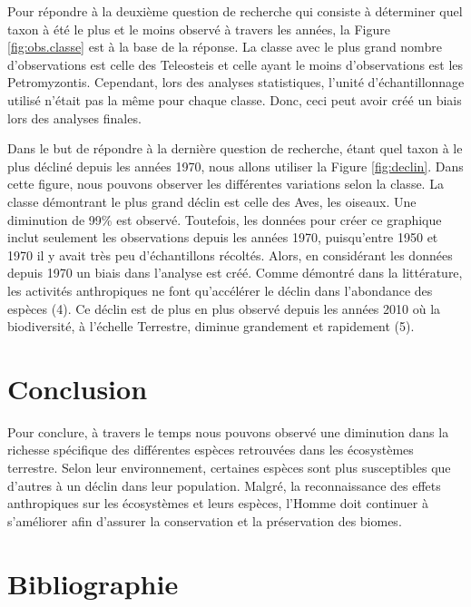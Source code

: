 \documentclass[9pt,twocolumn,twoside,]{pnas-new}
\begin{document}
Pour répondre à la deuxième question de recherche qui consiste à
déterminer quel taxon à été le plus et le moins observé à travers les
années, la Figure \ref{fig:obs.classe} est à la base de la réponse. La
classe avec le plus grand nombre d'observations est celle des Teleosteis
et celle ayant le moins d'observations est les Petromyzontis. Cependant,
lors des analyses statistiques, l'unité d'échantillonnage utilisé
n'était pas la même pour chaque classe. Donc, ceci peut avoir créé un
biais lors des analyses finales.

Dans le but de répondre à la dernière question de recherche, étant quel
taxon à le plus décliné depuis les années 1970, nous allons utiliser la
Figure \ref{fig:declin}. Dans cette figure, nous pouvons observer les
différentes variations selon la classe. La classe démontrant le plus
grand déclin est celle des Aves, les oiseaux. Une diminution de 99\% est
observé. Toutefois, les données pour créer ce graphique inclut seulement
les observations depuis les années 1970, puisqu'entre 1950 et 1970 il y
avait très peu d'échantillons récoltés. Alors, en considérant les
données depuis 1970 un biais dans l'analyse est créé. Comme démontré
dans la littérature, les activités anthropiques ne font qu'accélérer le
déclin dans l'abondance des espèces (4). Ce déclin est de plus en plus
observé depuis les années 2010 où la biodiversité, à l'échelle
Terrestre, diminue grandement et rapidement (5).

\section{Conclusion}\label{conclusion}

Pour conclure, à travers le temps nous pouvons observé une diminution
dans la richesse spécifique des différentes espèces retrouvées dans les
écosystèmes terrestre. Selon leur environnement, certaines espèces sont
plus susceptibles que d'autres à un déclin dans leur population. Malgré,
la reconnaissance des effets anthropiques sur les écosystèmes et leurs
espèces, l'Homme doit continuer à s'améliorer afin d'assurer la
conservation et la préservation des biomes.

\section*{Bibliographie}\label{bibliographie}

\pnasbreak
\end{document}
